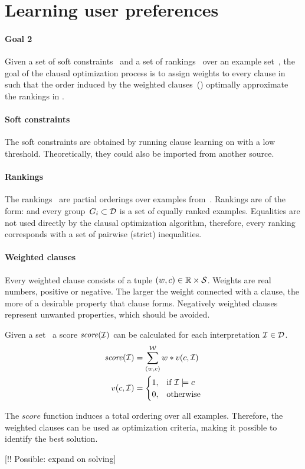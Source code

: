 \section{Learning user preferences}

\begin{framed}
	\noindent
	\begin{minipage}{\textwidth}
		\paragraph{Goal 2}
		Given a set of soft constraints~ and a set of rankings~ over an example set~, the goal of the clausal optimization process is to assign weights to every clause in~ such that the order induced by the weighted clauses~() optimally approximate the rankings in .
	\end{minipage}
\end{framed}

\paragraph{Soft constraints}
The soft constraints are obtained by running clause learning on  with a low threshold.
Theoretically, they could also be imported from another source.

\paragraph{Rankings}
The rankings~ are partial orderings over examples from~.
Rankings are of the form:  and every group~$G_i \subset \mathcal{D}$ is a set of equally ranked examples. Equalities are not used directly by the clausal optimization algorithm, therefore, every ranking corresponds with a set of pairwise (strict) inequalities.

\paragraph{Weighted clauses}
Every weighted clause consists of a tuple $(w, c) \in \mathbb{R} \times \mathcal{S}$.
Weights are real numbers, positive or negative.
The larger the weight connected with a clause, the more of a desirable property that clause forms.
Negatively weighted clauses represent unwanted properties, which should be avoided.

Given a set~ a score $\mathit{score}(\mathcal{I})$ can be calculated for each interpretation $\mathcal{I} \in \mathcal{D}$.
\begin{align*}
	\mathit{score}(\mathcal{I}) &= \sum\limits_{(w, c)}^{\mathcal{W}} w * v(c, \mathcal{I}) \\
	v(c, \mathcal{I}) &=
	\begin{cases}
		1,& \text{if } \mathcal{I} \models c\\
		0,& \text{otherwise}
	\end{cases}
\end{align*}

The $\mathit{score}$ function induces a total ordering over all examples.
Therefore, the weighted clauses  can be used as optimization criteria, making it possible to identify the best solution.

[!! Possible: expand on solving]